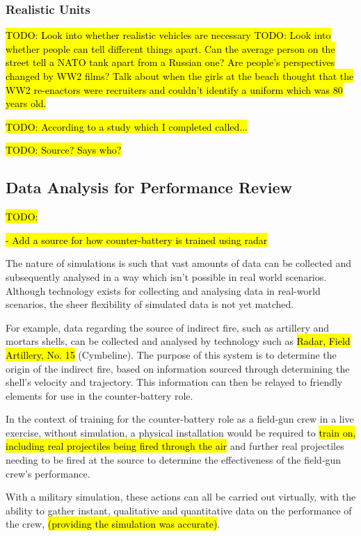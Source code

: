 \documentclass{article}
\begin{document}
\subsubsection{Realistic Units}

\hl{TODO: Look into whether realistic vehicles are necessary
TODO: Look into whether people can tell different things apart. Can the average person on the street tell a NATO tank apart from a Russian one? Are people's perspectives changed by WW2 films? Talk about when the girls at the beach thought that the WW2 re-enactors were recruiters and couldn't identify a uniform which was 80 years old.}

\hl{TODO: According to a study which I completed called... }

\hl{TODO: Source? Says who?}

\subsection{Data Analysis for Performance Review}

\hl{TODO:} 

\hl{- Add a source for how counter-battery is trained using radar}

The nature of simulations is such that vast amounts of data can be collected and subsequently analysed in a way which isn't possible in real world scenarios. Although technology exists for collecting and analysing data in real-world scenarios, the sheer flexibility of simulated data is not yet matched.

For example, data regarding the source of indirect fire, such as artillery and mortars shells, can be collected and analysed by technology such as \hl{Radar, Field Artillery, No. 15} (Cymbeline). The purpose of this system is to determine the origin of the indirect fire, based on information sourced through determining the shell's velocity and trajectory. This information can then be relayed to friendly elements for use in the counter-battery role.

In the context of training for the counter-battery role as a field-gun crew in a live exercise, without simulation, a physical installation would be required to \hl{train on, including real projectiles being fired through the air} and further real projectiles needing to be fired at the source to determine the effectiveness of the field-gun crew's performance.

With a military simulation, these actions can all be carried out virtually, with the ability to gather instant, qualitative and quantitative data on the performance of the crew, \hl{(providing the simulation was accurate)}.
\end{document}
